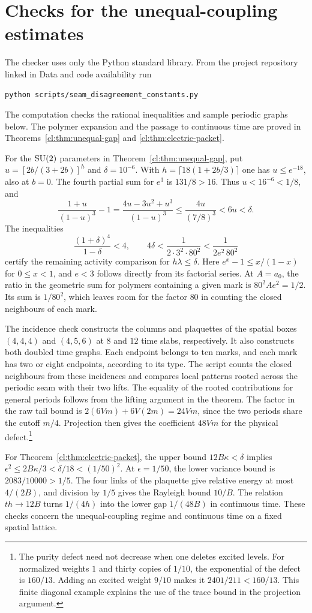 \section{Checks for the unequal-coupling estimates}\label{cl:app:anisotropic-checks}

The checker uses only the Python standard library. From the project
repository linked in Data and code availability run
\begin{verbatim}
python scripts/seam_disagreement_constants.py
\end{verbatim}
The computation checks the rational inequalities and sample periodic graphs
below. The polymer expansion and the passage to continuous time are proved in
Theorems~\ref{cl:thm:unequal-gap} and \ref{cl:thm:electric-packet}.

For the $\mathrm{SU}(2)$ parameters in Theorem~\ref{cl:thm:unequal-gap}, put
$u=[2b/(3+2b)]^h$ and $\delta=10^{-6}$. With
$h=\lceil18(1+2b/3)\rceil$ one has $u\le e^{-18}$, also at $b=0$.
The fourth partial sum for $e^3$ is $131/8>16$. Thus
$u<16^{-6}<1/8$, and
\[
 \frac{1+u}{(1-u)^3}-1
 =\frac{4u-3u^2+u^3}{(1-u)^3}
 \le\frac{4u}{(7/8)^3}<6u<\delta.
\]
The inequalities
\[
 \frac{(1+\delta)^4}{1-\delta}<4,\qquad
 4\delta < \frac{1}{2\cdot 3^2\cdot80^2}
 <\frac1{2e^2\,80^2}
\]
certify the remaining activity comparison for $h\lambda\le\delta$.
Here $e^x-1\le x/(1-x)$ for $0\le x<1$, and $e<3$ follows directly
from its factorial series. At $A=a_0$, the ratio in the geometric
sum for polymers containing a given mark is $80^2 A e^2=1/2$.
Its sum is $1/80^2$, which leaves room for the factor $80$ in
counting the closed neighbours of each mark.

The incidence check constructs the columns and plaquettes of the spatial
boxes $(4,4,4)$ and $(4,5,6)$ at $8$ and $12$ time slabs, respectively.
It also constructs both doubled time graphs. Each endpoint belongs to ten
marks, and each mark has two or eight endpoints, according to its type.
The script counts the closed neighbours from these incidences and compares
local patterns rooted across the periodic seam with their two lifts.
The equality of the rooted contributions for general periods follows
from the lifting argument in the theorem. The factor in the raw tail
bound is $2(6Vm)+6V(2m)=24Vm$, since the two periods share the cutoff
$m/4$. Projection then gives the coefficient $48Vm$ for the physical
defect.\footnote{The purity defect need not decrease when one deletes
excited levels. For normalized weights $1$ and thirty copies of $1/10$,
the exponential of the defect is $160/13$. Adding an excited weight $9/10$
makes it $2401/211<160/13$. This finite diagonal example explains the use
of the trace bound in the projection argument.}

For Theorem~\ref{cl:thm:electric-packet}, the upper bound
$12B\kappa<\delta$ implies
$\epsilon^2\le 2B\kappa/3<\delta/18<(1/50)^2$. At $\epsilon=1/50$,
the lower variance bound is $2083/10000>1/5$. The four links of the
plaquette give relative energy at most $4/(2B)$, and division by
$1/5$ gives the Rayleigh bound $10/B$. The relation $th\to12B$
turns $1/(4h)$ into the lower gap $1/(48B)$ in continuous time.
These checks concern the unequal-coupling regime and continuous time on
a fixed spatial lattice.
